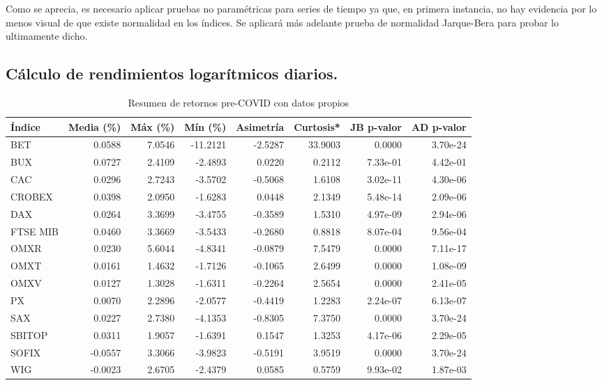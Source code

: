 \documentclass[12pt]{article}
\begin{document}
Como se aprecia, es necesario aplicar pruebas no paramétricas para series de tiempo ya que, en primera instancia, no hay evidencia por lo menos visual de que existe normalidad en los índices. Se aplicará más adelante prueba de normalidad Jarque-Bera para probar lo ultimamente dicho.

  \subsection {Cálculo de rendimientos logarítmicos diarios.}
  


\begin{table}[H]
\centering
\small
\caption{Resumen de retornos pre-COVID con datos propios}
\begin{tabular}{|l|r|r|r|r|r|r|r|}
\hline
\textbf{Índice} & \textbf{Media (\%)} & \textbf{Máx (\%)} & \textbf{Mín (\%)} & \textbf{Asimetría} & \textbf{Curtosis*} & \textbf{JB p-valor} & \textbf{AD p-valor} \\
\hline
BET     & 0.0588  &  7.0546 & -11.2121 & -2.5287 & 33.9003 & 0.0000     & 3.70e-24 \\
BUX     & 0.0727  &  2.4109 & -2.4893  &  0.0220 & 0.2112  & 7.33e-01   & 4.42e-01 \\
CAC     & 0.0296  &  2.7243 & -3.5702  & -0.5068 & 1.6108  & 3.02e-11   & 4.30e-06 \\
CROBEX  & 0.0398  &  2.0950 & -1.6283  &  0.0448 & 2.1349  & 5.48e-14   & 2.09e-06 \\
DAX     & 0.0264  &  3.3699 & -3.4755  & -0.3589 & 1.5310  & 4.97e-09   & 2.94e-06 \\
FTSE MIB& 0.0460  &  3.3669 & -3.5433  & -0.2680 & 0.8818  & 8.07e-04   & 9.56e-04 \\
OMXR    & 0.0230  &  5.6044 & -4.8341  & -0.0879 & 7.5479  & 0.0000     & 7.11e-17 \\
OMXT    & 0.0161  &  1.4632 & -1.7126  & -0.1065 & 2.6499  & 0.0000     & 1.08e-09 \\
OMXV    & 0.0127  &  1.3028 & -1.6311  & -0.2264 & 2.5654  & 0.0000     & 2.41e-05 \\
PX      & 0.0070  &  2.2896 & -2.0577  & -0.4419 & 1.2283  & 2.24e-07   & 6.13e-07 \\
SAX     & 0.0227  &  2.7380 & -4.1353  & -0.8305 & 7.3750  & 0.0000     & 3.70e-24 \\
SBITOP  & 0.0311  &  1.9057 & -1.6391  &  0.1547 & 1.3253  & 4.17e-06   & 2.29e-05 \\
SOFIX   & -0.0557 &  3.3066 & -3.9823  & -0.5191 & 3.9519  & 0.0000     & 3.70e-24 \\
WIG     & -0.0023 &  2.6705 & -2.4379  &  0.0585 & 0.5759  & 9.93e-02   & 1.87e-03 \\
\hline
\end{tabular}
\end{table}
\end{document}
